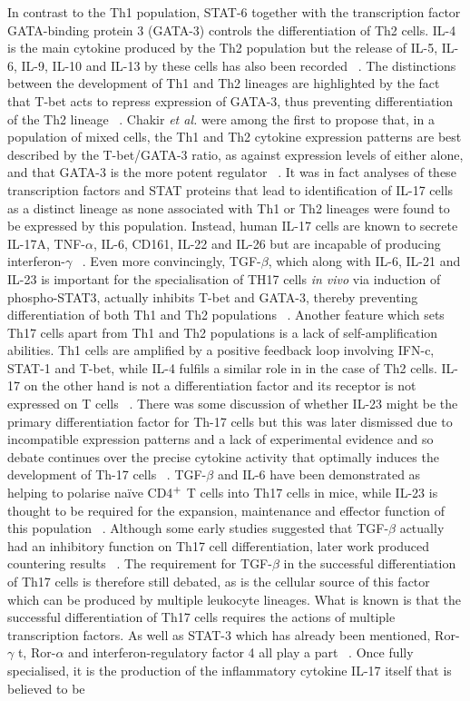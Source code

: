 In contrast to the Th1 population, STAT-6 together with the transcription factor GATA-binding protein 3 (GATA-3) controls the differentiation of Th2 cells. IL-4 is the main cytokine produced by the Th2 population but the release of  IL-5, IL-6, IL-9, IL-10 and IL-13 by these cells has also been recorded ~\autocite{Cha2003}. The distinctions between the development of Th1 and Th2 lineages are highlighted by the fact that T-bet acts to repress expression of GATA-3, thus preventing differentiation of the Th2 lineage ~\autocite{Cha2003,Edw2014}. Chakir \textit{et al.} were among the first to propose that, in a population of mixed cells, the Th1 and Th2 cytokine expression patterns are best described by the T-bet/GATA-3 ratio, as against expression levels of either alone, and that GATA-3 is the more potent regulator ~\autocite{Cha2003}. It was in fact analyses of these transcription factors and STAT proteins that lead to identification of IL-17 cells as a distinct lineage as none associated with Th1 or Th2 lineages were found to be expressed by this population. Instead, human IL-17 cells are known to secrete IL-17A, TNF-$\alpha$, IL-6, CD161, IL-22 and IL-26 but are incapable of producing interferon-$\gamma$ ~\autocite{Cro2009}. Even more convincingly, TGF-$\beta$, which along with IL-6, IL-21 and IL-23 is important for the specialisation of TH17 cells \textit{in vivo} via induction of phospho-STAT3, actually inhibits T-bet and GATA-3, thereby preventing differentiation of both Th1 and Th2 populations ~\autocite{Awa2009,Sch2014}. Another feature which sets Th17 cells apart from Th1 and Th2 populations is a lack of self-amplification abilities. Th1 cells are amplified by a positive feedback loop involving IFN-c, STAT-1 and T-bet, while IL-4 fulfils a similar role in in the case of Th2 cells. IL-17 on the other hand is not a differentiation factor and its receptor is not expressed on T cells ~\autocite{Awa2009}. There was some discussion of whether IL-23 might be the primary differentiation factor for Th-17 cells but this was later dismissed due to incompatible expression patterns and a lack of experimental evidence and so debate continues over the precise cytokine activity that optimally induces the development of Th-17 cells ~\autocite{Cro2009}. TGF-$\beta$ and IL-6 have been demonstrated as helping to polarise na\"ive CD4$\textsuperscript{+}$ T cells into Th17 cells in mice, while IL-23 is thought to be required for the expansion, maintenance and effector function of this population ~\autocite{Cro2009, Awa2009, Sch2014}. Although some early studies suggested that TGF-$\beta$ actually had an inhibitory function on Th17 cell differentiation, later work produced countering results ~\autocite{Awa2009}. The requirement for TGF-$\beta$ in the successful differentiation of Th17 cells is therefore still debated, as is the cellular source of this factor which can be produced by multiple leukocyte lineages. What is known is that the successful differentiation of Th17 cells requires the actions of multiple transcription factors. As well as STAT-3 which has already been mentioned, Ror-$\gamma$ t, Ror-$\alpha$ and interferon-regulatory factor 4 all play a part ~\autocite{Cro2009}. Once fully specialised, it is the production of the inflammatory cytokine IL-17 itself that is believed to be 